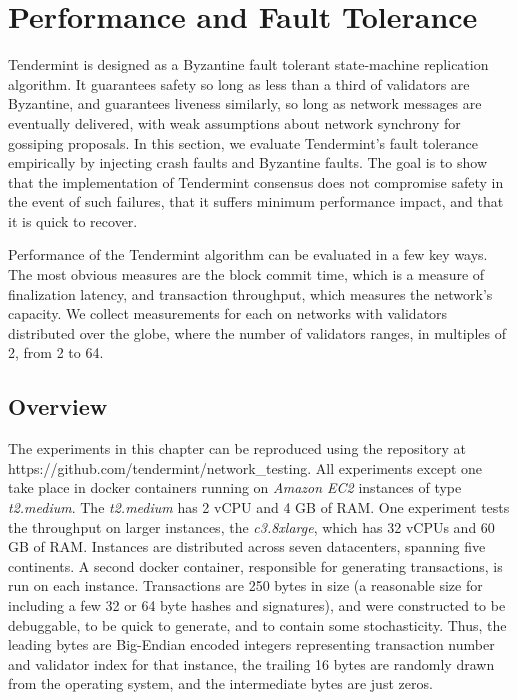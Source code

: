 \chapter{Performance and Fault Tolerance}
\label{ch:performance}

Tendermint is designed as a Byzantine fault tolerant state-machine replication algorithm.
It guarantees safety so long as less than a third of validators are Byzantine, 
and guarantees liveness similarly, so long as network messages are eventually delivered,
with weak assumptions about network synchrony for gossiping proposals.
In this section, we evaluate Tendermint's fault tolerance empirically by injecting 
crash faults and Byzantine faults.
The goal is to show that the implementation of Tendermint consensus does not compromise safety in the event of such failures,
that it suffers minimum performance impact, and that it is quick to recover.

Performance of the Tendermint algorithm can be evaluated in a few key ways.
The most obvious measures are the block commit time, which is a measure of finalization latency, 
and transaction throughput, which measures the network's capacity.
We collect measurements for each on networks with validators distributed over the globe, 
where the number of validators ranges, in multiples of 2, from 2 to 64.

\section{Overview}

The experiments in this chapter can be reproduced using the repository at https://github.com/tendermint/network\_testing.
All experiments except one take place in docker containers 
running on \emph{Amazon EC2} instances of type \emph{t2.medium}.
The \emph{t2.medium} has 2 vCPU and 4 GB of RAM.
One experiment tests the throughput on larger instances, the \emph{c3.8xlarge}, 
which has 32 vCPUs and 60 GB of RAM.
Instances are distributed across seven datacenters, spanning five continents.
A second docker container, responsible for generating transactions, is run on each instance.
Transactions are 250 bytes in size (a reasonable size for including a few 32 or 64 byte hashes and signatures),
and were constructed to be debuggable, to be quick to generate, and to contain some stochasticity.
Thus, the leading bytes are Big-Endian encoded integers 
representing transaction number and validator index for that instance,
the trailing 16 bytes are randomly drawn from the operating system, 
and the intermediate bytes are just zeros.

